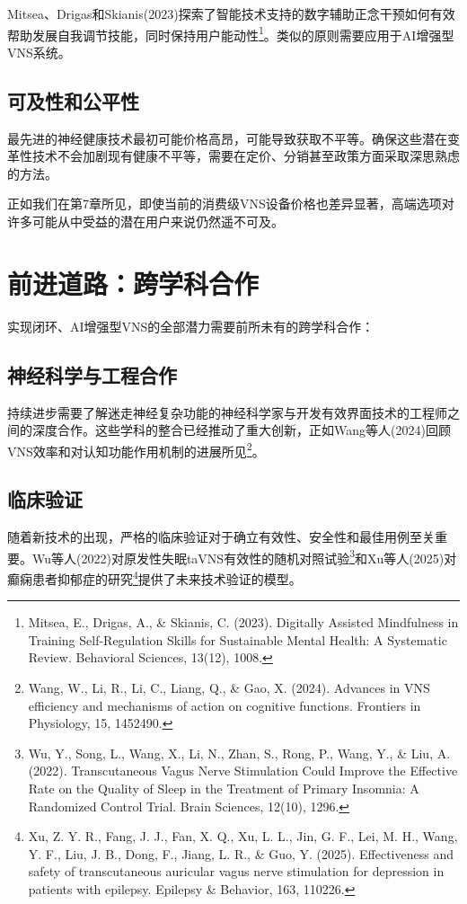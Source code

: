 \documentclass[
  Letterpaper,
]{scrbook}
\begin{document}
Mitsea、Drigas和Skianis(2023)探索了智能技术支持的数字辅助正念干预如何有效帮助发展自我调节技能，同时保持用户能动性\footnote{Mitsea,
  E., Drigas, A., \& Skianis, C. (2023). Digitally Assisted Mindfulness
  in Training Self-Regulation Skills for Sustainable Mental Health: A
  Systematic Review. Behavioral Sciences, 13(12), 1008.}。类似的原则需要应用于AI增强型VNS系统。

\subsection{可及性和公平性}\label{ux53efux53caux6027ux548cux516cux5e73ux6027}

最先进的神经健康技术最初可能价格高昂，可能导致获取不平等。确保这些潜在变革性技术不会加剧现有健康不平等，需要在定价、分销甚至政策方面采取深思熟虑的方法。

正如我们在第7章所见，即使当前的消费级VNS设备价格也差异显著，高端选项对许多可能从中受益的潜在用户来说仍然遥不可及。

\section{前进道路：跨学科合作}\label{ux524dux8fdbux9053ux8defux8de8ux5b66ux79d1ux5408ux4f5c}

实现闭环、AI增强型VNS的全部潜力需要前所未有的跨学科合作：

\subsection{神经科学与工程合作}\label{ux795eux7ecfux79d1ux5b66ux4e0eux5de5ux7a0bux5408ux4f5c}

持续进步需要了解迷走神经复杂功能的神经科学家与开发有效界面技术的工程师之间的深度合作。这些学科的整合已经推动了重大创新，正如Wang等人(2024)回顾VNS效率和对认知功能作用机制的进展所见\footnote{Wang,
  W., Li, R., Li, C., Liang, Q., \& Gao, X. (2024). Advances in VNS
  efficiency and mechanisms of action on cognitive functions. Frontiers
  in Physiology, 15, 1452490.}。

\subsection{临床验证}\label{ux4e34ux5e8aux9a8cux8bc1}

随着新技术的出现，严格的临床验证对于确立有效性、安全性和最佳用例至关重要。Wu等人(2022)对原发性失眠taVNS有效性的随机对照试验\footnote{Wu,
  Y., Song, L., Wang, X., Li, N., Zhan, S., Rong, P., Wang, Y., \& Liu,
  A. (2022). Transcutaneous Vagus Nerve Stimulation Could Improve the
  Effective Rate on the Quality of Sleep in the Treatment of Primary
  Insomnia: A Randomized Control Trial. Brain Sciences, 12(10), 1296.}和Xu等人(2025)对癫痫患者抑郁症的研究\footnote{Xu,
  Z. Y. R., Fang, J. J., Fan, X. Q., Xu, L. L., Jin, G. F., Lei, M. H.,
  Wang, Y. F., Liu, J. B., Dong, F., Jiang, L. R., \& Guo, Y. (2025).
  Effectiveness and safety of transcutaneous auricular vagus nerve
  stimulation for depression in patients with epilepsy. Epilepsy \&
  Behavior, 163, 110226.}提供了未来技术验证的模型。
\end{document}
